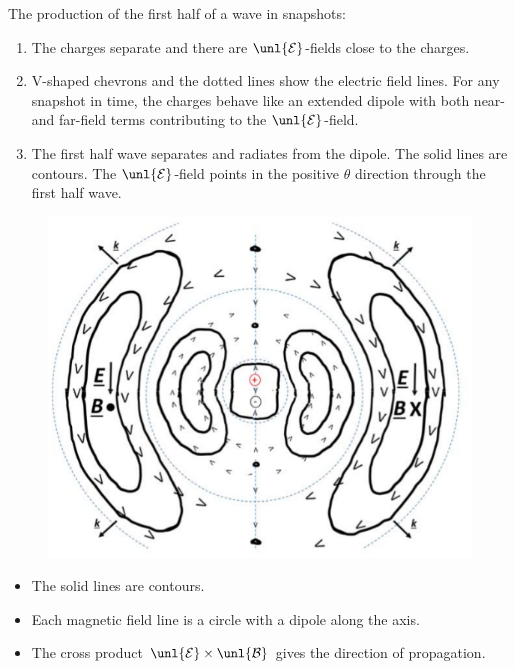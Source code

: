 \documentclass[a4paper, 11pt, normalem]{report}
\newcommand\E{\mathcal{E}}
\newcommand\uE{\unl{\E}}
\newcommand\B{\mathcal{B}}
\newcommand\uB{\unl{\B}}
\begin{document}
The production of the first half of a wave in snapshots:
\begin{enumerate}
	\item The charges separate and there are $\uE$-fields close to the charges.
	\item V-shaped chevrons and the dotted lines show the electric field lines.
	For any snapshot in time, the charges behave like an extended dipole with both near- and far-field terms contributing to the $\uE$-field.
	\item The first half wave separates and radiates from the dipole.
	The solid lines are contours.
	The $\uE$-field points in the positive $\theta$ direction through the first half wave.
\end{enumerate}

\begin{figure}[H]
	\centering
	\includegraphics[scale=0.4]{waveprod.png}
\end{figure}

\begin{itemize}
	\item The solid lines are contours.
	\item Each magnetic field line is a circle with a dipole along the axis.
	\item The cross product $\uE\times\uB$ gives the direction of propagation.
\end{itemize}
\end{document}
